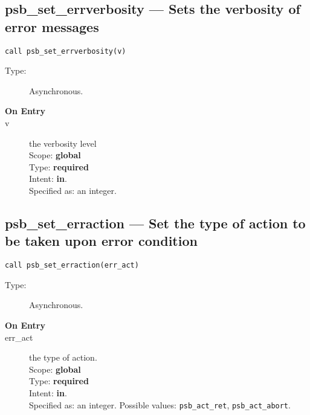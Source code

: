 \clearpage\subsection{psb\_set\_errverbosity --- Sets the verbosity of error
  messages}


\begin{lstlisting}
call psb_set_errverbosity(v)
\end{lstlisting}

\begin{description}
\item[Type:] Asynchronous.
\item[\bf On Entry]
\item[v] the verbosity level\\
Scope: {\bf global}\\
Type: {\bf required}\\
Intent: {\bf in}.\\
Specified as: an integer.
\end{description}

\clearpage\subsection{psb\_set\_erraction --- Set the type of action to be
  taken  upon error condition}

\begin{lstlisting}
call psb_set_erraction(err_act)
\end{lstlisting}

\begin{description}
\item[Type:] Asynchronous.
\item[\bf On Entry]
\item[err\_act] the type of action.\\
Scope: {\bf global} \\
Type: {\bf required}\\
Intent: {\bf in}.\\
Specified as: an integer. Possible values: \verb|psb_act_ret|,
\verb|psb_act_abort|. 
\end{description}


